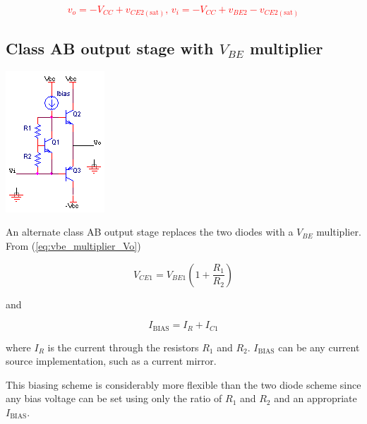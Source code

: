 \textcolor{red}{
\begin{equation}
v_{o} = -V_{CC}+v_{CE2(\text{sat})}\text{, }v_{i} = -V_{CC}+v_{BE2}-v_{CE2(\text{sat})}
\end{equation}
}

\subsection{Class AB output stage with $V_{BE}$ multiplier}
\begin{center}
	\includegraphics{schematics/classABvbemultiplier.PNG}
\end{center}
An alternate class AB output stage replaces the two diodes with a $V_{BE}$ multiplier. From (\ref{eq:vbe_multiplier_Vo})

\begin{equation}
V_{CE1} = V_{BE1}\left(1+\frac{R_{1}}{R_{2}}\right)
\end{equation}

\noindent and

\begin{equation}
I_{\text{BIAS}} = I_{R} + I_{C1}
\end{equation}

\noindent where $I_{R}$ is the current through the resistors $R_{1}$ and $R_{2}$. $I_{\text{BIAS}}$ can be any current source implementation, such as a current mirror.
\par
This biasing scheme is considerably more flexible than the two diode scheme since any bias voltage can be set using only the ratio of $R_{1}$ and $R_{2}$ and an appropriate $I_{\text{BIAS}}$.

